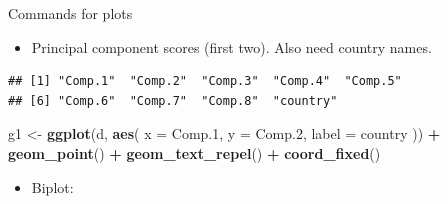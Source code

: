 \documentclass[ignorenonframetext,]{beamer}
\newenvironment{Shaded}{\begin{snugshade}}{\end{snugshade}}
\newcommand{\DataTypeTok}[1]{\textcolor[rgb]{0.13,0.29,0.53}{#1}}
\newcommand{\FloatTok}[1]{\textcolor[rgb]{0.00,0.00,0.81}{#1}}
\newcommand{\KeywordTok}[1]{\textcolor[rgb]{0.13,0.29,0.53}{\textbf{#1}}}
\newcommand{\NormalTok}[1]{#1}
\newcommand{\OperatorTok}[1]{\textcolor[rgb]{0.81,0.36,0.00}{\textbf{#1}}}
\newcommand{\StringTok}[1]{\textcolor[rgb]{0.31,0.60,0.02}{#1}}
\providecommand{\tightlist}{%
  \setlength{\itemsep}{0pt}\setlength{\parskip}{0pt}}
\begin{document}
\begin{frame}[fragile]{Commands for plots}
\protect\hypertarget{commands-for-plots}{}

\begin{itemize}
\tightlist
\item
  Principal component scores (first two). Also need country names.
\end{itemize}

\begin{Shaded}
\end{Shaded}

\begin{verbatim}
## [1] "Comp.1"  "Comp.2"  "Comp.3"  "Comp.4"  "Comp.5" 
## [6] "Comp.6"  "Comp.7"  "Comp.8"  "country"
\end{verbatim}

\begin{Shaded}
\begin{Highlighting}[]
\NormalTok{g1 <-}\StringTok{ }\KeywordTok{ggplot}\NormalTok{(d, }\KeywordTok{aes}\NormalTok{(}
  \DataTypeTok{x =}\NormalTok{ Comp}\FloatTok{.1}\NormalTok{, }\DataTypeTok{y =}\NormalTok{ Comp}\FloatTok{.2}\NormalTok{,}
  \DataTypeTok{label =}\NormalTok{ country}
\NormalTok{)) }\OperatorTok{+}
\StringTok{  }\KeywordTok{geom_point}\NormalTok{() }\OperatorTok{+}\StringTok{ }\KeywordTok{geom_text_repel}\NormalTok{() }\OperatorTok{+}
\StringTok{  }\KeywordTok{coord_fixed}\NormalTok{()}
\end{Highlighting}
\end{Shaded}

\begin{itemize}
\tightlist
\item
  Biplot:
\end{itemize}

\begin{Shaded}
\end{Shaded}

\end{frame}
\end{document}
